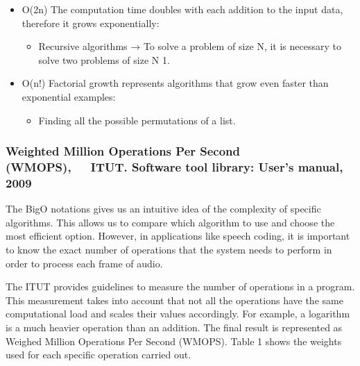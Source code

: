 \documentclass[letterpaper,10pt,english]{jupyterBook}
\begin{document}
\begin{itemize}
\begin{itemize}
\end{itemize}

\item {} 
\sphinxAtStartPar
O(2n) \sphinxhyphen{} The computation time doubles with each addition
to the input data, therefore it grows exponentially:
\begin{itemize}
\item {} 
\sphinxAtStartPar
Recursive algorithms → To solve a problem of size N, it is
necessary to solve two problems of size N \sphinxhyphen{} 1.

\end{itemize}

\item {} 
\sphinxAtStartPar
O(n!) \sphinxhyphen{} Factorial growth represents algorithms that grow even faster
than exponential examples:
\begin{itemize}
\item {} 
\sphinxAtStartPar
Finding all the possible permutations of a list.

\end{itemize}

\end{itemize}


\subsubsection{Weighted Million Operations Per Second (WMOPS),   ITU\sphinxhyphen{}T. Software tool library: User’s manual, 2009 }
\label{\detokenize{Evaluation/Other_performance_measures:weighted-million-operations-per-second-wmops-itu-t-software-tool-library-users-manual-2009}}
\sphinxAtStartPar
The Big\sphinxhyphen{}O notations gives us an intuitive idea of the complexity of
specific algorithms. This allows us to compare which algorithm to use
and choose the most efficient option. However, in applications like
speech coding, it is important to know the exact number of operations
that the system needs to perform in order to process each frame of
audio.

\sphinxAtStartPar
The ITU\sphinxhyphen{}T provides guidelines to measure the number of operations in a
program. This measurement takes into account that not all the operations
have the same computational load and scales their values accordingly.
For example, a logarithm is a much heavier operation than an addition.
The final result is represented as Weighed Million Operations Per Second
(WMOPS). Table 1 shows the weights used for each specific operation
carried out.
\end{document}
